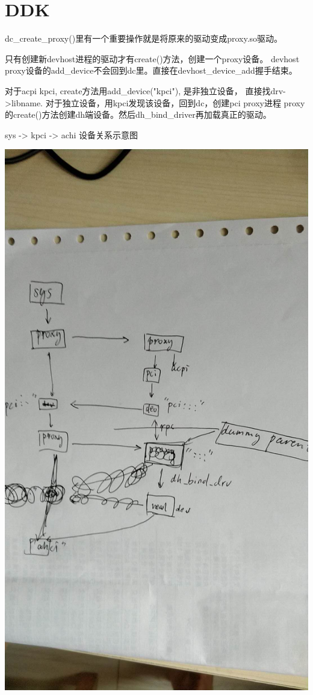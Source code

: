 \section{DDK}

dc\_create\_proxy()里有一个重要操作就是将原来的驱动变成proxy.so驱动。

只有创建新devhost进程的驱动才有create()方法，创建一个proxy设备。
devhost proxy设备的add_device不会回到dc里。直接在devhost\_device\_add握手结束。

对于acpi kpci, create方法用add_device("kpci"), 是非独立设备，
直接找drv->libname. 对于独立设备，用kpci发现该设备，回到dc，创建pci proxy进程
proxy的create()方法创建dh端设备。然后dh_bind_driver再加载真正的驱动。

sys -> kpci -> achi 设备关系示意图

\includegraphics[scale=0.3]{devdrv.jpeg}

